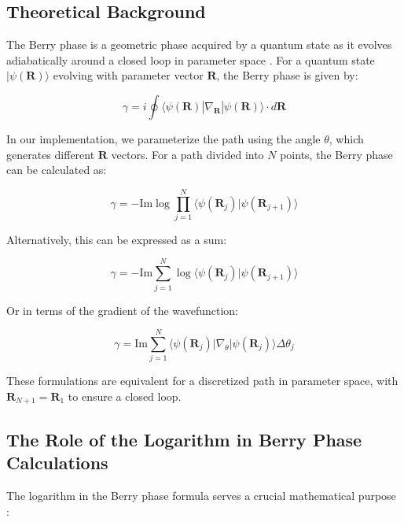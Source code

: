 \documentclass{article}
\begin{document}
\subsection{Theoretical Background}

The Berry phase is a geometric phase acquired by a quantum state as it evolves adiabatically around a closed loop in parameter space \cite{Bernevig2013, Hasan2010}. For a quantum state $|\psi(\mathbf{R})\rangle$ evolving with parameter vector $\mathbf{R}$, the Berry phase is given by:

\begin{equation}
\gamma = i \oint \langle \psi(\mathbf{R}) | \nabla_{\mathbf{R}} | \psi(\mathbf{R}) \rangle \cdot d\mathbf{R}
\end{equation}

In our implementation, we parameterize the path using the angle $\theta$, which generates different $\mathbf{R}$ vectors. For a path divided into $N$ points, the Berry phase can be calculated as:

\begin{equation}
\gamma = -\text{Im} \log \prod_{j=1}^{N} \langle \psi(\mathbf{R}_j) | \psi(\mathbf{R}_{j+1}) \rangle
\end{equation}

Alternatively, this can be expressed as a sum:

\begin{equation}
\gamma = -\text{Im} \sum_{j=1}^{N} \log \langle \psi(\mathbf{R}_j) | \psi(\mathbf{R}_{j+1}) \rangle
\end{equation}

Or in terms of the gradient of the wavefunction:

\begin{equation}
\gamma = \text{Im} \sum_{j=1}^{N} \langle \psi(\mathbf{R}_j) | \nabla_{\theta} | \psi(\mathbf{R}_j) \rangle \Delta\theta_j
\end{equation}

These formulations are equivalent for a discretized path in parameter space, with $\mathbf{R}_{N+1} = \mathbf{R}_1$ to ensure a closed loop.

\subsection{The Role of the Logarithm in Berry Phase Calculations}

The logarithm in the Berry phase formula serves a crucial mathematical purpose \cite{Xiao2010, Vanderbilt2018, Resta2000}:
\end{document}
